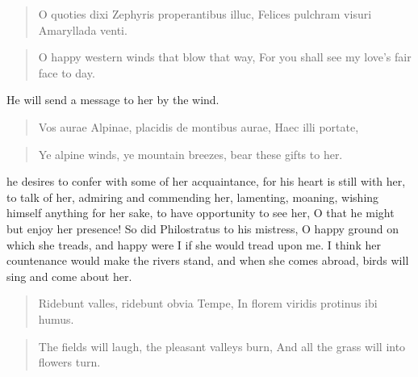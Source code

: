 \begin{latin}
\begin{verse}
O quoties dixi Zephyris properantibus illuc,
Felices pulchram visuri Amaryllada venti.
\end{verse}
\end{latin}
\translationrule%
\begin{verse}%
O happy western winds that blow that way,
For you shall see my love's fair face to day.
\end{verse}%

He will send a message to her by the wind.

\begin{latin}
\begin{verse}
Vos aurae Alpinae, placidis de montibus aurae,
Haec illi portate,
\end{verse}
\end{latin}
\translationrule%
\begin{verse}%
Ye alpine winds, ye mountain breezes,
bear these gifts to her.
\end{verse}%

he desires to confer with some of her acquaintance, for his heart
is still with her, to talk of her, admiring and commending her,
lamenting, moaning, wishing himself anything for her sake, to have
opportunity to see her, O that he might but enjoy her presence! So did
Philostratus to his mistress, O happy ground on which she treads,
and happy were I if she would tread upon me. I think her countenance
would make the rivers stand, and when she comes abroad, birds will sing
and come about her.

\begin{latin}
\begin{verse}
Ridebunt valles, ridebunt obvia Tempe,
In florem viridis protinus ibi humus.
\end{verse}
\end{latin}
\translationrule%
\begin{verse}%
The fields will laugh, the pleasant valleys burn,
And all the grass will into flowers turn.
\end{verse}%

